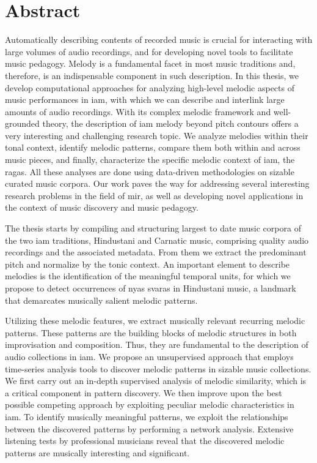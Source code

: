 
\chapter{Abstract}

Automatically describing contents of recorded music is crucial for interacting with large volumes of audio recordings, and for developing novel tools to facilitate music pedagogy. Melody is a fundamental facet in most music traditions and, therefore, is an indispensable component in such description. In this thesis, we develop computational approaches for analyzing high-level melodic aspects of music performances in \gls{iam}, with which we can describe and interlink large amounts of audio recordings. With its complex melodic framework and well-grounded theory, the description of \gls{iam} melody beyond pitch contours offers a very interesting and challenging research topic. We analyze melodies within their tonal context, identify melodic patterns, compare them both within and across music pieces, and finally, characterize the specific melodic context of \gls{iam}, the \glspl{raga}. All these analyses are done using data-driven methodologies on sizable curated music corpora. Our work paves the way for addressing several interesting research problems in the field of \acrlong{mir}, as well as developing novel applications in the context of music discovery and music pedagogy.

The thesis starts by compiling and structuring largest to date music corpora of the two \gls{iam} traditions, Hindustani and Carnatic music, comprising quality audio recordings and the associated metadata. From them we extract the predominant pitch and normalize by the tonic context. An important element to describe melodies is the identification of the meaningful temporal units, for which we propose to detect occurrences of \gls{nyas} \glspl{svara} in Hindustani music, a landmark that demarcates musically salient melodic patterns.

Utilizing these melodic features, we extract musically relevant recurring melodic patterns. These patterns are the building blocks of melodic structures in both improvisation and composition. Thus, they are fundamental to the description of audio collections in \gls{iam}. We propose an unsupervised approach that employs time-series analysis tools to discover melodic patterns in sizable music collections. We first carry out an in-depth supervised analysis of melodic similarity, which is a critical component in pattern discovery. We then improve upon the best possible competing approach by exploiting peculiar melodic characteristics in \gls{iam}. To identify musically meaningful patterns, we exploit the relationships between the discovered patterns by performing a network analysis. Extensive listening tests by professional musicians reveal that the discovered melodic patterns are musically interesting and significant.

